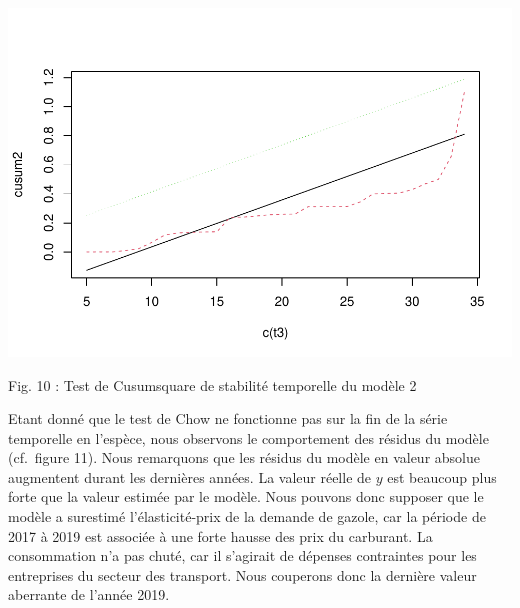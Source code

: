 \documentclass[
]{article}
\begin{document}
\begin{center}\includegraphics[width=0.7\linewidth,height=0.7\textheight]{Projet_econometrie_II_files/figure-latex/unnamed-chunk-11-1} \end{center}

Fig. 10 : Test de Cusumsquare de stabilité temporelle du modèle 2

Etant donné que le test de Chow ne fonctionne pas sur la fin de la série
temporelle en l'espèce, nous observons le comportement des résidus du
modèle (cf.~figure 11). Nous remarquons que les résidus du modèle en
valeur absolue augmentent durant les dernières années. La valeur réelle
de \(y\) est beaucoup plus forte que la valeur estimée par le modèle.
Nous pouvons donc supposer que le modèle a surestimé l'élasticité-prix
de la demande de gazole, car la période de 2017 à 2019 est associée à
une forte hausse des prix du carburant. La consommation n'a pas chuté,
car il s'agirait de dépenses contraintes pour les entreprises du secteur
des transport. Nous couperons donc la dernière valeur aberrante de
l'année 2019.
\end{document}
